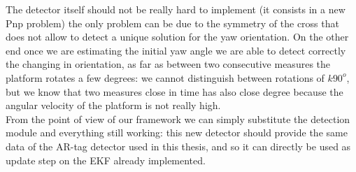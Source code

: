 The detector itself should not be really hard to implement  (it consists in a new Pnp problem) the only problem can be due to the symmetry of the cross that does not allow to detect a unique solution for the yaw orientation. On the other end once we are estimating the initial yaw angle we are able to detect correctly the changing in orientation, as far as between two consecutive measures the platform rotates a few degrees: we cannot distinguish between rotations of $k90^o$, but we know that two measures close in time has also close degree because the angular velocity of the platform is not really high.\\

From the point of view of our framework we can simply substitute the detection module and everything still working: this new detector should provide the same data of the AR-tag detector used in this thesis, and so it can directly be used as update step on the EKF already implemented.\\